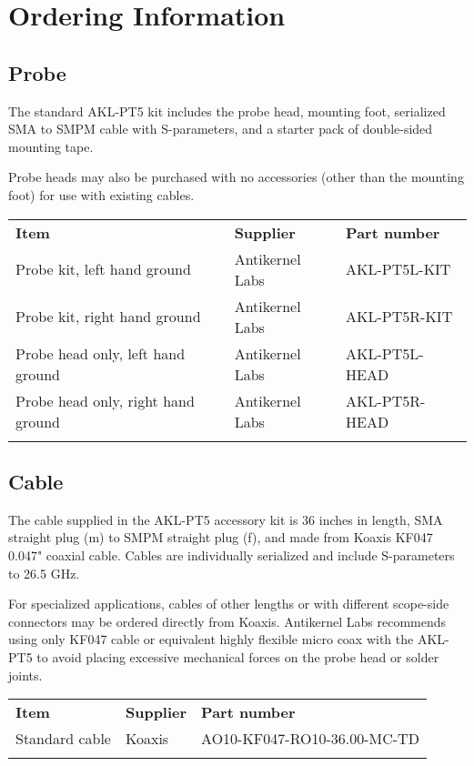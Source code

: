 \documentclass[11pt]{article}
\newcommand{\thinhline}{\Xhline{1\arrayrulewidth}}
\newcommand{\thickhline}{\Xhline{2.5\arrayrulewidth}}
\begin{document}
\pagebreak
\section{Ordering Information}

\subsection{Probe}

The standard AKL-PT5 kit includes the probe head, mounting foot, serialized SMA to SMPM cable with S-parameters, and a
starter pack of double-sided mounting tape.

Probe heads may also be purchased with no accessories (other than the mounting foot) for use with existing cables.

\begin{tabularx}{16cm}{llX}
\thickhline
\textbf{Item} & \textbf{Supplier} & \textbf{Part number} \\
\thickhline
Probe kit, left hand ground & Antikernel Labs & AKL-PT5L-KIT \\
\thinhline
Probe kit, right hand ground & Antikernel Labs & AKL-PT5R-KIT \\
\thinhline
Probe head only, left hand ground & Antikernel Labs & AKL-PT5L-HEAD \\
\thinhline
Probe head only, right hand ground & Antikernel Labs & AKL-PT5R-HEAD \\
\thickhline
\end{tabularx}

\subsection{Cable}

The cable supplied in the AKL-PT5 accessory kit is 36 inches in length, SMA straight plug (m) to SMPM straight plug
(f), and made from Koaxis KF047 0.047" coaxial cable. Cables are individually serialized and include S-parameters to
26.5 GHz.

For specialized applications, cables of other lengths or with different scope-side connectors may be ordered directly
from Koaxis. Antikernel Labs recommends using only KF047 cable or equivalent highly flexible micro coax with the
AKL-PT5 to avoid placing excessive mechanical forces on the probe head or solder joints.

\begin{tabularx}{16cm}{llX}
\thickhline
\textbf{Item} & \textbf{Supplier} & \textbf{Part number} \\
\thickhline
Standard cable & Koaxis & AO10-KF047-RO10-36.00-MC-TD \\
\thickhline
\end{tabularx}
\end{document}
